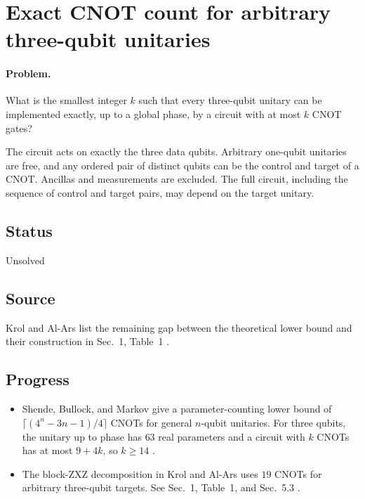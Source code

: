 \section{Exact CNOT count for arbitrary three-qubit unitaries}
\label{sec:op_8cd24cb9148d9dab}

\paragraph{Problem.}
What is the smallest integer $k$ such that every three-qubit unitary can be implemented exactly, up to a global phase, by a circuit with at most $k$ CNOT gates?

The circuit acts on exactly the three data qubits. Arbitrary one-qubit unitaries are free, and any ordered pair of distinct qubits can be the control and target of a CNOT. Ancillas and measurements are excluded. The full circuit, including the sequence of control and target pairs, may depend on the target unitary.

\subsection*{Status}

Unsolved

\subsection*{Source}

Krol and Al-Ars list the remaining gap between the theoretical lower bound and their construction in Sec.~1, Table~1 .

\subsection*{Progress}

\begin{itemize}
  \item Shende, Bullock, and Markov give a parameter-counting lower bound of $\lceil(4^n-3n-1)/4\rceil$ CNOTs for general $n$-qubit unitaries. For three qubits, the unitary up to phase has $63$ real parameters and a circuit with $k$ CNOTs has at most $9+4k$, so $k\geq 14$ .

  \item The block-ZXZ decomposition in Krol and Al-Ars uses $19$ CNOTs for arbitrary three-qubit targets. See Sec.~1, Table~1, and Sec.~5.3 .
\end{itemize}

